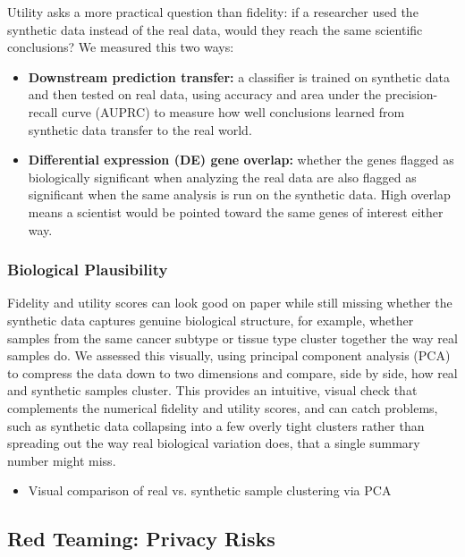 \documentclass[webpdf,contemporary,large]{oup-authoring-template}%
\theoremstyle{thmstyleone}%
\theoremstyle{thmstyletwo}%
\theoremstyle{thmstylethree}%
\begin{document}
Utility asks a more practical question than fidelity: if a researcher used the synthetic data instead of the real data, would they reach the same scientific conclusions? We measured this two ways:

\begin{itemize}
  \item \textbf{Downstream prediction transfer:} a classifier is trained
        on synthetic data and then tested on real data, using accuracy
        and area under the precision-recall curve (AUPRC) to measure how
        well conclusions learned from synthetic data transfer to the real
        world.
  \item \textbf{Differential expression (DE) gene overlap:} whether the
        genes flagged as biologically significant when analyzing the real
        data are also flagged as significant when the same analysis is
        run on the synthetic data. High overlap means a scientist would
        be pointed toward the same genes of interest either way.
\end{itemize}

\subsubsection{Biological Plausibility}

Fidelity and utility scores can look good on paper while still missing whether the synthetic data captures genuine biological structure, for example, whether samples from the same cancer subtype or tissue type cluster together the way real samples do. We assessed this visually, using principal component analysis (PCA) to compress the data down to two dimensions and compare, side by side, how real and synthetic samples cluster. This provides an intuitive, visual check that complements the numerical fidelity and utility scores, and can catch problems, such as synthetic data collapsing into a few overly tight clusters rather than spreading out the way real biological variation does, that a single summary number might miss.

\begin{itemize}
  \item Visual comparison of real vs. synthetic sample clustering via PCA
\end{itemize}

\subsection{Red Teaming: Privacy Risks}
\end{document}
